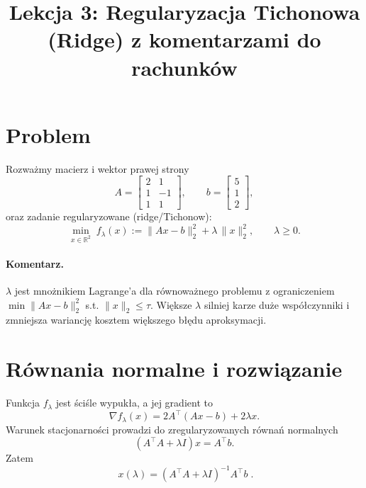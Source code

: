 \documentclass[12pt]{article}
\title{Lekcja 3: Regularyzacja Tichonowa (Ridge) z komentarzami do rachunków}
\author{}
\date{}
\begin{document}
\maketitle

\section*{Problem}
Rozważmy macierz i wektor prawej strony
\[
A=\begin{bmatrix}2 & 1\\ 1 & -1\\ 1 & 1\end{bmatrix},\qquad
b=\begin{bmatrix}5\\1\\2\end{bmatrix},
\]
oraz zadanie regularyzowane (ridge/Tichonow):
\begin{equation}
\label{eq:ridge}
\min_{x\in \mathbb{R}^2}\; f_\lambda(x):=\|Ax-b\|_2^2 + \lambda \, \|x\|_2^2,\qquad \lambda\ge 0.
\end{equation}

\paragraph{Komentarz.} \(\lambda\) jest mnożnikiem Lagrange'a dla równoważnego problemu z ograniczeniem \(\min \|Ax-b\|_2^2\) s.t. \(\|x\|_2\le \tau\). Większe \(\lambda\) silniej karze duże współczynniki i zmniejsza wariancję kosztem większego błędu aproksymacji.

\section*{Równania normalne i rozwiązanie}
Funkcja \(f_\lambda\) jest ściśle wypukła, a jej gradient to
\[
\nabla f_\lambda(x)=2A^{\top}(Ax-b)+2\lambda x.
\]
Warunek stacjonarności prowadzi do zregularyzowanych równań normalnych
\begin{equation}
\label{eq:normal}
(A^{\top}A+\lambda I)x=A^{\top}b.
\end{equation}
Zatem
\begin{equation}
\label{eq:closed}
\boxed{\;x(\lambda)=(A^{\top}A+\lambda I)^{-1}A^{\top}b\;}. 
\end{equation}
\end{document}
